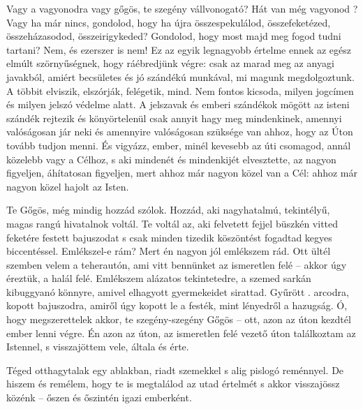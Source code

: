 \documentclass{IEEEtran}
\begin{document}
Vagy a vagyonodra vagy gőgös, te szegény vállvonogató? Hát van még vagyonod ?
Vagy ha már nincs, gondolod, hogy ha újra összespekulálod, összefeketézed,
összeházasodod, összeirigykeded? Gondolod, hogy most majd meg fogod tudni
tartani? Nem, és ezerszer is nem! Ez az egyik legnagyobb értelme ennek az
egész elmúlt szörnyűségnek, hogy ráébredjünk végre: csak az marad meg az
anyagi javakból, amiért becsületes és jó szándékú munkával, mi magunk
megdolgoztunk. A többit elviszik, elszórják, felégetik, mind. Nem fontos
kicsoda, milyen jogcímen és milyen jelszó védelme alatt. A jelszavak és emberi
szándékok mögött az isteni szándék rejtezik és könyörtelenül csak annyit hagy
meg mindenkinek, amennyi valóságosan jár neki és amennyire valóságosan
szüksége van ahhoz, hogy az Úton tovább tudjon menni. És vigyázz, ember, minél
kevesebb az úti csomagod, annál közelebb vagy a Célhoz, s aki mindenét és
mindenkijét elvesztette, az nagyon figyeljen, áhítatosan figyeljen, mert ahhoz
már nagyon közel van a Cél: ahhoz már nagyon közel hajolt az Isten.

Te Gőgös, még mindig hozzád szólok. Hozzád, aki nagyhatalmú, tekintélyű, magas
rangú hivatalnok voltál. Te voltál az, aki felvetett fejjel büszkén vitted
feketére festett bajuszodat s csak minden tizedik köszöntést fogadtad kegyes
biccentéssel. Emlékszel-e rám? Mert én nagyon jól emlékszem rád. Ott ültél
szemben velem a teherautón, ami vitt bennünket az ismeretlen felé – akkor úgy
éreztük, a halál felé. Emlékszem alázatos tekintetedre, a szemed sarkán
kibuggyanó könnyre, amivel elhagyott gyermekeidet sirattad. Gyűrött . arcodra,
kopott bajuszodra, amiről úgy kopott le a festék, mint lényedről a hazugság.
Ó, hogy megszerettelek akkor, te szegény-szegény Gőgös – ott, azon az úton
kezdtél ember lenni végre. Én azon az úton, az ismeretlen felé vezető úton
találkoztam az Istennel, s visszajöttem vele, általa és érte.

Téged otthagytalak egy ablakban, riadt szemekkel s alig pislogó reménnyel. De
hiszem és remélem, hogy te is megtalálod az utad értelmét s akkor visszajössz
közénk – őszen és őszintén igazi emberként.
\end{document}

